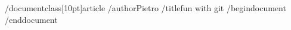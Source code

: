 /documentclass[10pt]{article}
/author{Pietro}
/title{fun with git}
/begin{document}
/end{document}

